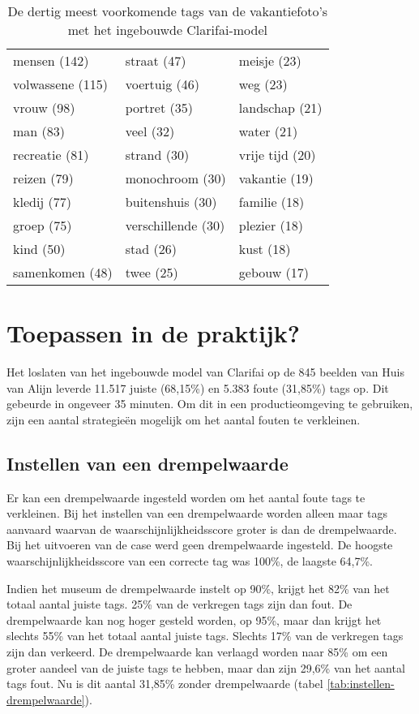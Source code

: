 \begin{table}
	\centering
	\begin{tabular}{*{3}{l}}
		mensen (142) & straat (47) & meisje (23) \\
		volwassene (115) & voertuig (46) & weg (23) \\
		vrouw (98) & portret (35) & landschap (21) \\
		man (83) & veel (32) & water (21) \\
		recreatie (81) & strand (30) & vrije tijd (20) \\
		reizen (79) & monochroom (30) & vakantie (19) \\
		kledij (77) & buitenshuis (30) & familie (18) \\
		groep (75) & verschillende (30) & plezier (18) \\
		kind (50) & stad (26) & kust (18) \\
		samenkomen (48) & twee (25) & gebouw (17) \\
	\end{tabular}
	\caption{De dertig meest voorkomende tags van de vakantiefoto's met het ingebouwde Clarifai-model}
	\label{tab:30-termen-vakantie}
\end{table}

\section{Toepassen in de praktijk?}

Het loslaten van het ingebouwde model van Clarifai op de 845 beelden van Huis van Alijn leverde 11.517 juiste (68,15\%) en 5.383 foute (31,85\%) tags op. Dit gebeurde in ongeveer 35 minuten. Om dit in een productieomgeving te gebruiken, zijn een aantal strategieën mogelijk om het aantal fouten te verkleinen.

\subsection{Instellen van een drempelwaarde}

Er kan een drempelwaarde ingesteld worden om het aantal foute tags te verkleinen. Bij het instellen van een drempelwaarde worden alleen maar tags aanvaard waarvan de waarschijnlijkheidsscore groter is dan de drempelwaarde. Bij het uitvoeren van de case werd geen drempelwaarde ingesteld. De hoogste waarschijnlijkheidsscore van een correcte tag was 100\%, de laagste 64,7\%.

Indien het museum de drempelwaarde instelt op 90\%, krijgt het 82\% van het totaal aantal juiste tags. 25\% van de verkregen tags zijn dan fout. De drempelwaarde kan nog hoger gesteld worden, op 95\%, maar dan krijgt het slechts 55\% van het totaal aantal juiste tags. Slechts 17\% van de verkregen tags zijn dan verkeerd. De drempelwaarde kan verlaagd worden naar 85\% om een groter aandeel van de juiste tags te hebben, maar dan zijn 29,6\% van het aantal tags fout. Nu is dit aantal 31,85\% zonder drempelwaarde (tabel \ref{tab:instellen-drempelwaarde}).

